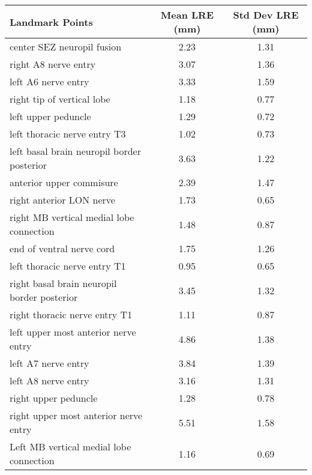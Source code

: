 \begin{tabular}{lcc}
\hline
 ﻿Landmark Points                            & Mean LRE (mm) & Std Dev LRE (mm) \\ \hline \hline
 center SEZ neuropil fusion                  & 2.23          & 1.31             \\
 right A8 nerve entry                        & 3.07          & 1.36             \\
 left A6 nerve entry                         & 3.33          & 1.59             \\
 right tip of vertical lobe                  & 1.18          & 0.77             \\
 left upper peduncle                         & 1.29          & 0.72             \\
 left thoracic nerve entry T3                & 1.02          & 0.73             \\
 left basal brain neuropil border posterior  & 3.63          & 1.22             \\
 anterior upper commisure                    & 2.39          & 1.47             \\
 right anterior LON nerve                    & 1.73          & 0.65             \\
 right MB vertical medial lobe connection    & 1.48          & 0.87             \\
 end of ventral nerve cord                   & 1.75          & 1.26             \\
 left thoracic nerve entry T1                & 0.95          & 0.65             \\
 right basal brain neuropil border posterior & 3.45          & 1.32             \\
 right thoracic nerve entry T1               & 1.11          & 0.87             \\
 left upper most anterior nerve entry        & 4.86          & 1.38             \\
 left A7 nerve entry                         & 3.84          & 1.39             \\
 left A8 nerve entry                         & 3.16          & 1.31             \\
 right upper peduncle                        & 1.28          & 0.78             \\
 right upper most anterior nerve entry       & 5.51          & 1.58             \\
 Left MB vertical medial lobe connection     & 1.16          & 0.69             \\

\end{tabular}

